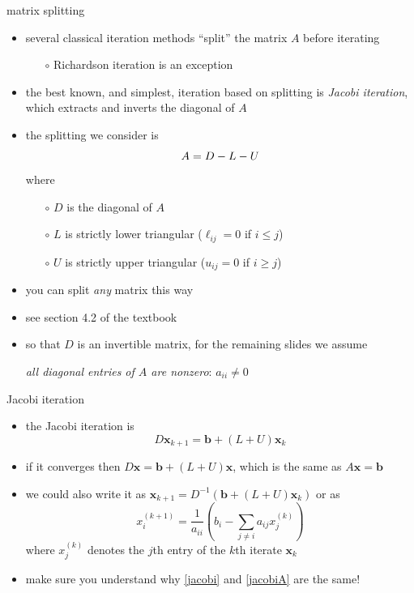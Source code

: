 \documentclass[10pt,hyperref]{beamer}
\newcommand{\bb}{\mathbf{b}}
\newcommand{\bx}{\mathbf{x}}
\begin{document}
\begin{frame}{matrix splitting}

\begin{itemize}
\item several classical iteration methods ``split'' the matrix $A$ before iterating
  \begin{itemize}
  \item[$\circ$] Richardson iteration is an exception
  \end{itemize}
\item the best known, and simplest, iteration based on splitting is \emph{Jacobi iteration}, which extracts and inverts the diagonal of $A$
\item the splitting we consider is
    $$A = D - L - U \vspace{-3mm}$$
where
  \begin{itemize}
  \item[$\circ$] $D$ is the diagonal of $A$
  \item[$\circ$] $L$ is strictly lower triangular ($\ell_{ij} = 0$ if $i \le j$)
  \item[$\circ$] $U$ is strictly upper triangular ($u_{ij} = 0$ if $i \ge j$)
  \end{itemize}
\item you can split \emph{any} matrix this way
\item see section 4.2 of the textbook

\medskip
\item so that $D$ is an invertible matrix, for the remaining slides we assume

\centerline{\emph{all diagonal entries of $A$ are nonzero}: \quad  $a_{ii} \ne 0$}
\end{itemize}
\end{frame}


\begin{frame}{Jacobi iteration}

\begin{itemize}
\item the Jacobi iteration is
\begin{equation}
D \bx_{k+1} = \bb + (L + U) \bx_k  \label{jacobi}
\end{equation}
\item if it converges then $D\bx = \bb + (L+U)\bx$, which is the same as $A \bx = \bb$
\item we could also write it as \quad $\bx_{k+1} = D^{-1} \left(\bb + (L + U) \bx_k\right)$ \quad or as
\begin{equation}
x_i^{(k+1)} = \frac{1}{a_{ii}} \left(b_i - \sum_{j\ne i} a_{ij} x_j^{(k)}\right)  \label{jacobiA}
\end{equation}
where $x_j^{(k)}$ denotes the $j$th entry of the $k$th iterate $\bx_k$

\medskip
\item make sure you understand why \eqref{jacobi} and \eqref{jacobiA} are the same!
\end{itemize}
\end{frame}
\end{document}
